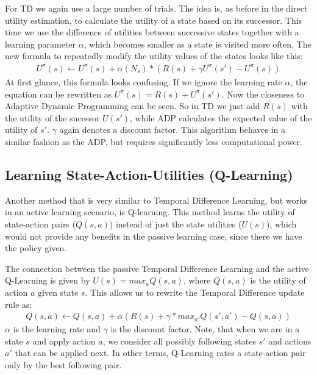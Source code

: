 \documentclass{llncs}
\begin{document}
For TD we again use a large number of trials. The idea is, as before in the direct utility estimation, to calculate the utility of a state based on its successor. This time we use the difference of utilities between successive states together with a learning parameter $\alpha$, which becomes smaller as a state is visited more often. The new formula to repeatedly modify the utility values of the states looks like this:
\begin{align*}
U^{\pi}(s) \leftarrow U^{\pi}(s)+\alpha(N_s)*(R(s)+\gamma U^{\pi}(s')-U^{\pi}(s))
\end{align*}
At first glance, this formula looks confusing. If we ignore the learning rate $\alpha$, the equation can be rewritten as $U^{\pi}(s)=R(s)+ U^{\pi}(s')$. Now the closeness to Adaptive Dynamic Programming can be seen.  So in TD we just add $R(s)$ with the utility of the sucessor $U(s')$, while ADP calculates the expected value of the utility of $s'$. $\gamma$ again denotes a discount factor. This algorithm behaves in a similar fashion as the ADP, but requires significantly less computational power.

\subsection{Learning State-Action-Utilities (Q-Learning)}
Another method that is very similar to Temporal Difference Learning, but works in an active learning scenario, is Q-learning. This method learns the utility of state-action pairs ($Q(s,a)$) instead of just the state utilities ($U(s)$), which would not provide any benefits in the passive learning case, since there we have the policy given.\par

The connection between the passive Temporal Difference Learning and the active Q-Learning is given by $U(s)=max_aQ(s,a)$, where $Q(s,a)$ is the utility of action $a$ given state $s$. This allows us to rewrite the Temporal Difference update rule as:
\begin{align*}
	Q(s,a)\leftarrow Q(s,a)+\alpha(R(s)+\gamma*max_{a'}Q(s',a')-Q(s,a))
\end{align*}
$\alpha$ is the learning rate and $\gamma$ is the discount factor.
Note, that when we are in a state $s$ and apply action $a$, we consider all possibly following states $s'$ and actions $a'$ that can be applied next. In other terms, Q-Learning rates a state-action pair only by the best following pair.
\end{document}
